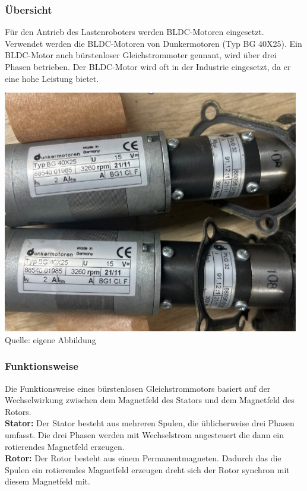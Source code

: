 \documentclass[ngerman,12pt,a4paper]{article}
\begin{document}
			\subsubsection{Übersicht}
			Für den Antrieb des Lastenroboters werden BLDC-Motoren eingesetzt. Verwendet werden die BLDC-Motoren von Dunkermotoren (Typ BG 40X25). Ein BLDC-Motor auch bürstenloser Gleichstrommoter gennant, wird über drei Phasen betrieben. Der BLDC-Motor wird oft in der Industrie eingesetzt, da er eine hohe Leistung bietet.
			
			\begin{center}
				\begin{minipage}{\textwidth}
					\centering
					\includegraphics[scale=0.5]{Pictures/Motoren}
					\label{fig:spiffs_init}
					\vspace{-2pt}
					{\small Quelle: eigene Abbildung}
				\end{minipage}
			\end{center}
			
			\subsubsection{Funktionsweise}
			Die Funktionsweise eines bürstenlosen Gleichstrommotors basiert auf der Wechselwirkung zwischen dem Magnetfeld des Stators und dem Magnetfeld des Rotors.\\[0.5cm]
			\textbf{Stator:} Der Stator besteht aus mehreren Spulen, die üblicherweise drei Phasen umfasst. Die drei Phasen werden mit Wechselstrom angesteuert die dann ein rotierendes Magnetfeld erzeugen.\\[0.5cm]
			\textbf{Rotor:} Der Rotor besteht aus einem Permanentmagneten. Dadurch das die Spulen ein rotierendes Magnetfeld erzeugen dreht sich der Rotor synchron mit diesem Magnetfeld mit.
			
\end{document}
